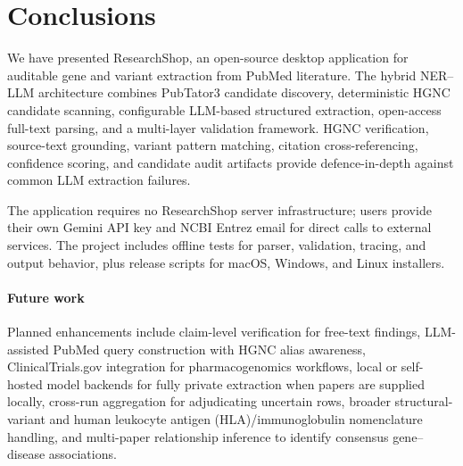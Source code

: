 \section{Conclusions}
\label{sec:conclusions}

We have presented ResearchShop, an open-source desktop application for auditable gene and variant extraction from PubMed literature. The hybrid NER--LLM architecture combines PubTator3 candidate discovery, deterministic HGNC candidate scanning, configurable LLM-based structured extraction, open-access full-text parsing, and a multi-layer validation framework. HGNC verification, source-text grounding, variant pattern matching, citation cross-referencing, confidence scoring, and candidate audit artifacts provide defence-in-depth against common LLM extraction failures.

The application requires no ResearchShop server infrastructure; users provide their own Gemini API key and NCBI Entrez email for direct calls to external services. The project includes offline tests for parser, validation, tracing, and output behavior, plus release scripts for macOS, Windows, and Linux installers.

\paragraph{Future work} Planned enhancements include claim-level verification for free-text findings, LLM-assisted PubMed query construction with HGNC alias awareness, ClinicalTrials.gov integration for pharmacogenomics workflows, local or self-hosted model backends for fully private extraction when papers are supplied locally, cross-run aggregation for adjudicating uncertain rows, broader structural-variant and human leukocyte antigen (HLA)/immunoglobulin nomenclature handling, and multi-paper relationship inference to identify consensus gene--disease associations.
